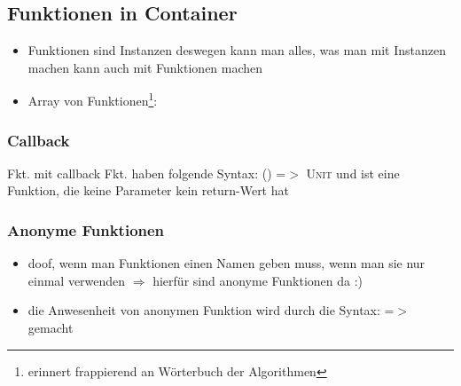   


\subsection{Funktionen in Container}
\begin{itemize}
  \item Funktionen sind Instanzen \und deswegen kann man alles, was man
  mit Instanzen machen kann auch mit Funktionen machen
  \item Array von Funktionen\footnote{erinnert frappierend an
  Wörterbuch der Algorithmen}:
  
    
\end{itemize}


\subsubsection{Callback}
Fkt. mit callback Fkt. haben folgende Syntax: 
  \textsc{() =$>$ Unit} und ist eine Funktion, die keine Parameter \und 
  kein return-Wert hat
  
  


\subsubsection{Anonyme Funktionen}
\begin{itemize}
  \item doof, wenn man Funktionen einen Namen geben muss, wenn man sie
  nur einmal verwenden $\Rightarrow$ hierfür sind anonyme Funktionen da :)
  \item die Anwesenheit von anonymen Funktion wird durch die Syntax:
  \textsc{=$>$} gemacht
  
  
\end{itemize}


